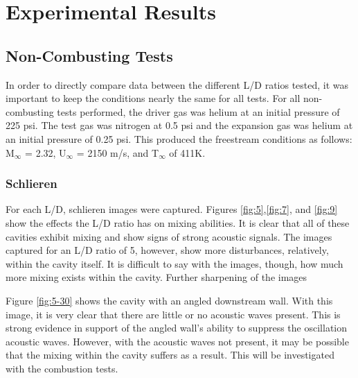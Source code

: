 
\chapter{Experimental Results} %

\label{Chapter4} %



\section{Non-Combusting Tests}

In order to directly compare data between the different L/D ratios tested, it was important to keep the conditions nearly the same for all tests. For all non-combusting tests performed, the driver gas was helium at an initial pressure of 225 psi. The test gas was nitrogen at 0.5 psi and the expansion gas was helium at an initial pressure of 0.25 psi. This produced the freestream conditions as follows: M$_\infty$ = 2.32, U$_\infty$ = 2150 m/s, and T$_\infty$ of 411K. 

\subsection{Schlieren}

For each L/D, schlieren images were captured. Figures \ref{fig:5},\ref{fig:7}, and \ref{fig:9} show the effects the L/D ratio has on mixing abilities. It is clear that all of these cavities exhibit mixing and show signs of strong acoustic signals. The images captured for an L/D ratio of 5, however, show more disturbances, relatively, within the cavity itself. It is difficult to say with the images, though, how much more mixing exists within the cavity. Further sharpening of the images

Figure \ref{fig:5-30} shows the cavity with an angled downstream wall. With this image, it is very clear that there are little or no acoustic waves present. This is strong evidence in support of the angled wall's ability to suppress the oscillation acoustic waves. However, with the acoustic waves not present, it may be possible that the mixing within the cavity suffers as a result. This will be investigated with the combustion tests. 

